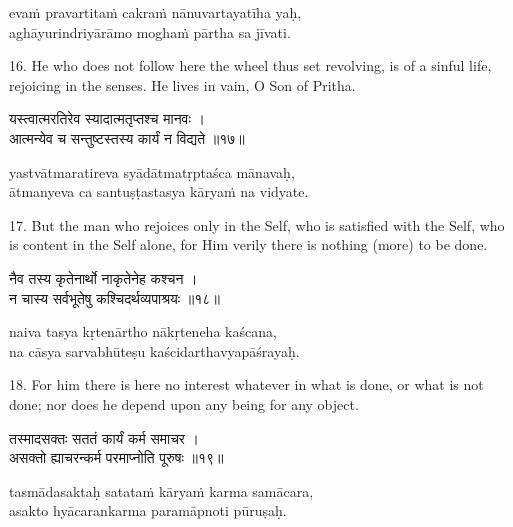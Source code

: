 \begin{transliteration}
evaṁ pravartitaṁ cakraṁ nānuvartayatīha yaḥ, \\
aghāyurindriyārāmo moghaṁ pārtha sa jīvati.
\end{transliteration}

16. He who does not follow here the wheel thus set revolving, is of a sinful
life, rejoicing in the senses. He lives in vain, O Son of Pritha.

\begin{gitaverse}
यस्त्वात्मरतिरेव स्यादात्मतृप्तश्च मानवः । \\
आत्मन्येव च सन्तुष्टस्तस्य कार्यं न विद्यते ॥१७॥
\end{gitaverse}

\begin{transliteration}
yastvātmaratireva syādātmatṛptaśca mānavaḥ, \\
ātmanyeva ca santuṣṭastasya kāryaṁ na vidyate.
\end{transliteration}

17. But the man who rejoices only in the Self, who is satisfied with the Self,
who is content in the Self alone, for Him verily there is nothing (more) to be
done.

\begin{gitaverse}
नैव तस्य कृतेनार्थो नाकृतेनेह कश्चन । \\
न चास्य सर्वभूतेषु कश्चिदर्थव्यपाश्रयः ॥१८॥
\end{gitaverse}

\begin{transliteration}
naiva tasya kṛtenārtho nākṛteneha kaścana, \\
na cāsya sarvabhūteṣu kaścidarthavyapāśrayaḥ.
\end{transliteration}

18. For him there is here no interest whatever in what is done, or what is not
done; nor does he depend upon any being for any object.

\begin{gitaverse}
तस्मादसक्तः सततं कार्यं कर्म समाचर । \\
असक्तो ह्याचरन्कर्म परमाप्नोति पूरुषः ॥१९॥
\end{gitaverse}

\begin{transliteration}
tasmādasaktaḥ satataṁ kāryaṁ karma samācara, \\
asakto hyācarankarma paramāpnoti pūruṣaḥ.
\end{transliteration}

